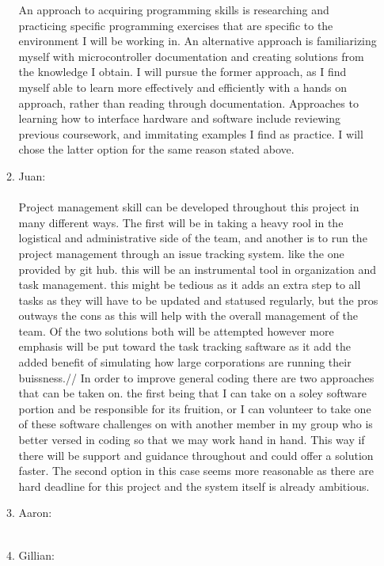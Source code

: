 \documentclass[12pt]{article}
\begin{document}
\begin{enumerate}
\begin{enumerate}
    An approach to acquiring programming skills is researching and practicing specific
    programming exercises that are specific to the environment I will be working in.
    An alternative approach is familiarizing myself with microcontroller documentation and
    creating solutions from the knowledge I obtain. I will pursue the former approach, as 
    I find myself able to learn more effectively and efficiently with a hands on approach, 
    rather than reading through documentation. Approaches to learning how to interface 
    hardware and software include reviewing previous coursework, and immitating examples
    I find as practice. I will chose the latter option for the same reason stated above.\\
    \item{Juan:}\\\\
        Project management skill can be developed throughout this project in many different ways. The first will be in taking a heavy rool in the logistical and administrative side of the team, and another is to run the project management through an issue tracking system.
        like the one provided by git hub. this will be an instrumental tool in organization and task management. this might be tedious as it adds an extra step to all tasks as they will have to be updated and statused regularly, but the pros outways the cons 
        as this will help with the overall management of the team. Of the two solutions both will be attempted however more emphasis will be put toward the task tracking saftware as it add the added benefit of simulating how large corporations are running their buissness.//
        In order to improve general coding there are two approaches that can be taken on. the first being that I can take on a soley software portion and be responsible for its fruition, or I can volunteer to take one of these software challenges on with another member in 
        my group who is better versed in coding so that we may work hand in hand. This way if there will be support and guidance throughout and could offer a solution faster. The second option in this case seems more reasonable as there are hard deadline for this project and the system itself is already ambitious.
    \item{Aaron:}\\\\
    \item {Gillian:}\\\\
  \end{enumerate}
\end{enumerate}
\end{document}
